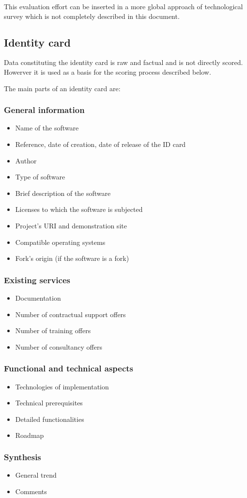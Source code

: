 This evaluation effort can be inserted in a more global approach of technological survey which is not completely described in this document.

\subsection{Identity card}
Data constituting the identity card is raw and factual and is not directly scored. Howerver it is used as a basis for the scoring process described below.


The main parts of an identity card are:


\subsubsection{General information}
\begin{itemize}
\item Name of the software
\item Reference, date of creation, date of release of the ID card
\item Author 
\item Type of software 
\item Brief description of the software
\item Licenses to which the software is subjected
\item Project's URI and demonstration site
\item Compatible operating systems
\item Fork's origin (if the software is a fork)
\end{itemize}

\subsubsection{Existing services}
\begin{itemize}
\item Documentation
\item Number of contractual support offers
\item Number of training offers
\item Number of consultancy offers
\end{itemize}

\subsubsection{Functional and technical aspects}
\begin{itemize}
\item Technologies of implementation
\item Technical prerequisites
\item Detailed functionalities
\item Roadmap
\end{itemize}

\subsubsection{Synthesis}
\begin{itemize}
\item General trend
\item Comments
\end{itemize}
